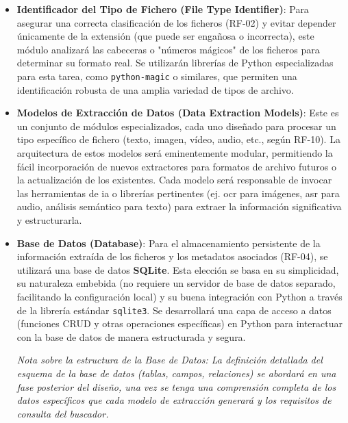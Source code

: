 \begin{itemize}
    \item \textbf{Identificador del Tipo de Fichero (File Type Identifier)}:
    Para asegurar una correcta clasificación de los ficheros (RF-02) y evitar depender únicamente de la extensión (que puede ser engañosa o incorrecta), este módulo analizará las cabeceras o "números mágicos" de los ficheros para determinar su formato real. Se utilizarán librerías de Python especializadas para esta tarea, como \texttt{python-magic} o similares, que permiten una identificación robusta de una amplia variedad de tipos de archivo.

    \item \textbf{Modelos de Extracción de Datos (Data Extraction Models)}:
    Este es un conjunto de módulos especializados, cada uno diseñado para procesar un tipo específico de fichero (texto, imagen, vídeo, audio, etc., según RF-10). La arquitectura de estos modelos será eminentemente modular, permitiendo la fácil incorporación de nuevos extractores para formatos de archivo futuros o la actualización de los existentes. Cada modelo será responsable de invocar las herramientas de \gls{ia} o librerías pertinentes (ej. \gls{ocr} para imágenes, \gls{asr} para audio, análisis semántico para texto) para extraer la información significativa y estructurarla.

    \item \textbf{Base de Datos (Database)}:
    Para el almacenamiento persistente de la información extraída de los ficheros y los metadatos asociados (RF-04), se utilizará una base de datos \textbf{SQLite}. Esta elección se basa en su simplicidad, su naturaleza embebida (no requiere un servidor de base de datos separado, facilitando la configuración local) y su buena integración con Python a través de la librería estándar \texttt{sqlite3}. Se desarrollará una capa de acceso a datos (funciones CRUD y otras operaciones específicas) en Python para interactuar con la base de datos de manera estructurada y segura.
    
    \textit{Nota sobre la estructura de la Base de Datos: La definición detallada del esquema de la base de datos (tablas, campos, relaciones) se abordará en una fase posterior del diseño, una vez se tenga una comprensión completa de los datos específicos que cada modelo de extracción generará y los requisitos de consulta del buscador.}


\end{itemize}
